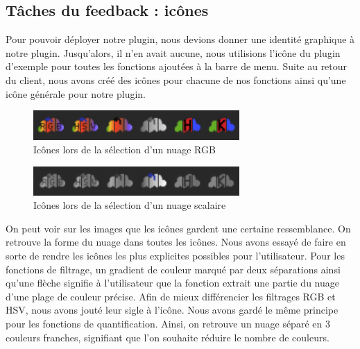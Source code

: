 \documentclass[12pt,titlepage,french]{article}
\begin{document}
\subsection{Tâches du feedback : icônes}

Pour pouvoir déployer notre plugin, nous devions donner une identité graphique à notre plugin. Jusqu'alors, il n'en avait aucune, nous utilisions l'icône du plugin d'exemple pour toutes les fonctions ajoutées à la barre de menu. Suite au retour du client, nous avons créé des icônes pour chacune de nos fonctions ainsi qu'une icône générale pour notre plugin. \newline

\begin{figure}[H]
 \caption{\label{} Icônes lors de la sélection d'un nuage RGB}
 \begin{center}
 \includegraphics[width=0.7\textwidth]{./img/icones_rgb.png}
  \end{center}
\end{figure}

\begin{figure}[H]
 \caption{\label{} Icônes lors de la sélection d'un nuage scalaire}
 \begin{center}
 \includegraphics[width=0.7\textwidth]{./img/icones_scal.png}
  \end{center}
\end{figure}

On peut voir sur les images que les icônes gardent une certaine ressemblance. On retrouve la forme du nuage dans toutes les icônes. \newline
Nous avons essayé de faire en sorte de rendre les icônes les plus explicites possibles pour l'utilisateur. Pour les fonctions de filtrage, un gradient de couleur marqué par deux séparations ainsi qu'une flèche signifie à l'utilisateur que la fonction extrait une partie du nuage d'une plage de couleur précise. Afin de mieux différencier les filtrages RGB et HSV, nous avons jouté leur sigle à l'icône. Nous avons gardé le même principe pour les fonctions de quantification. Ainsi, on retrouve un nuage séparé en 3 couleurs franches, signifiant que l'on souhaite réduire le nombre de couleurs. \newline
\end{document}
